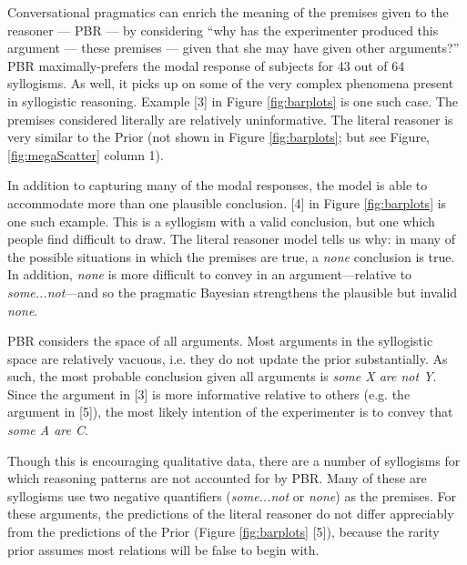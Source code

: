 \documentclass[10pt,letterpaper]{article}
\begin{document}
%


Conversational pragmatics can enrich the meaning of the premises given to the reasoner --- PBR --- by considering ``why has the experimenter produced this argument --- these premises --- given that she may have given other arguments?'' 
PBR maximally-prefers the modal response of subjects for 43 out of 64 syllogisms. As well, it picks up on some of the very complex phenomena present in syllogistic reasoning. Example [3] in Figure \ref{fig:barplots} is one such case. The premises considered literally are relatively uninformative. The literal reasoner is very similar to the Prior (not shown in Figure \ref{fig:barplots}; but see Figure, \ref{fig:megaScatter} column 1). 

In addition to capturing many of the modal responses, the model is able to accommodate more than one plausible conclusion. [4] in Figure \ref{fig:barplots} is one such example. This is a syllogism with a valid conclusion, but one which people find difficult to draw. The literal reasoner model tells us why: in many of the possible situations in which the premises are true, a \emph{none} conclusion is true. In addition, \emph{none} is more difficult to convey in an argument---relative to \emph{some...not}---and so the pragmatic Bayesian strengthens the plausible but invalid \emph{none}.


PBR considers the space of all arguments. Most arguments in the syllogistic space are relatively vacuous, i.e. they do not update the prior substantially. As such, the most probable conclusion given all arguments is  \emph{some X are not Y}. Since the argument in [3] is more informative relative to others (e.g. the argument in [5]), the most likely intention of the experimenter is to convey that \emph{some A are C}.

Though this is encouraging qualitative data, there are a number of syllogisms for which reasoning patterns are not accounted for by PBR. Many of these are syllogisms use two negative quantifiers (\emph{some...not} or \emph{none}) as the premises. For these arguments, the predictions of the literal reasoner do not differ appreciably from the predictions of the Prior (Figure \ref{fig:barplots} [5]), because the rarity prior assumes most relations will be false to begin with. 
\end{document}
